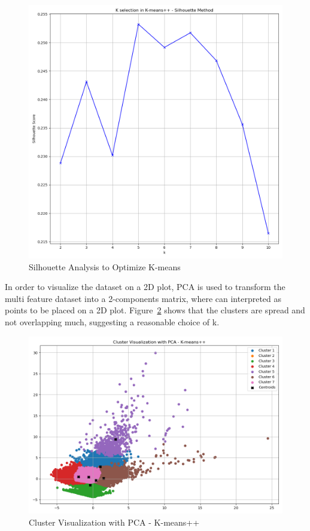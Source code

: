 \begin{figure}
    \centering
    \includegraphics[width=1\linewidth]{docs//assets/kmeans_silhouette_method.png}
    \caption{Silhouette Analysis to Optimize K-means}
    \label{fig:kmeans-sil}
\end{figure}

In order to visualize the dataset on a 2D plot, PCA is used to transform the multi feature dataset into a 2-components matrix, where can interpreted as points to be placed on a 2D plot. Figure~\ref{fig:pca-kmeans} shows that the clusters are spread and not overlapping much, suggesting a reasonable choice of k.

\begin{figure}
    \centering
    \includegraphics[width=1\linewidth]{docs//assets/Cluster Visualization with PCA - K-means++.png}
    \caption{Cluster Visualization with PCA - K-means++}
    \label{fig:pca-kmeans}
\end{figure}

